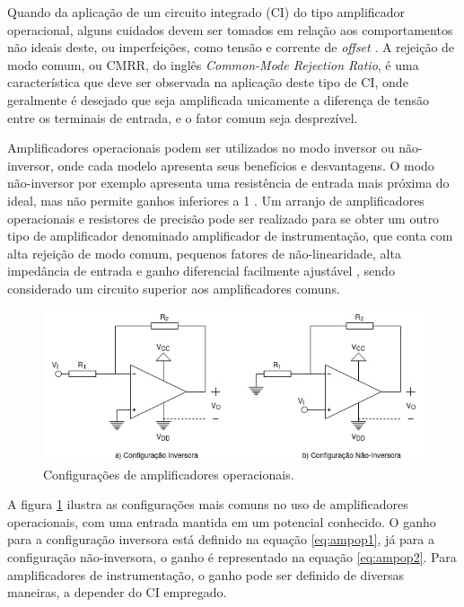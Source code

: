 Quando da aplicação de um circuito integrado (CI) do tipo amplificador
operacional, alguns cuidados devem ser tomados em relação aos
comportamentos não ideais deste, ou imperfeições, 
como tensão e corrente de \textit{offset} \cite{sedra1998microelectronic}.
A rejeição de modo comum, ou CMRR, do inglês \textit{Common-Mode Rejection Ratio},
é uma característica que deve ser observada na aplicação deste tipo de 
CI, onde geralmente é desejado que seja amplificada unicamente a 
diferença de tensão entre os terminais de entrada, e o fator comum
seja desprezível.

Amplificadores operacionais podem ser utilizados no modo inversor ou 
não-inversor, onde cada modelo apresenta seus benefícios e desvantagens.
O modo não-inversor por exemplo apresenta uma resistência de entrada mais
próxima do ideal, mas não permite ganhos inferiores a 1 \cite{sedra1998microelectronic}.
Um arranjo de amplificadores operacionais e resistores de precisão 
pode ser realizado para se obter um outro tipo de amplificador denominado
amplificador de instrumentação, que conta com alta rejeição de modo comum, 
pequenos fatores de não-linearidade, alta impedância de entrada e ganho
diferencial facilmente ajustável \cite{kitchin2006designer}, sendo 
considerado um circuito superior aos amplificadores comuns.

\begin{figure}[h]
    \caption{Configurações de amplificadores operacionais.}    
    
    \begin{centering}
        \includegraphics[width=1\columnwidth]{images/fundamentos/AmpOps.png}
    \par\end{centering}

    \label{fig:ampops}
\end{figure}

A figura \ref{fig:ampops} ilustra as configurações mais comuns no uso
de amplificadores operacionais, com uma entrada mantida em um potencial
conhecido. O ganho para a configuração inversora está definido na 
equação \ref{eq:ampop1}, já para a configuração não-inversora, o ganho é 
representado na equação \ref{eq:ampop2}. Para amplificadores de 
instrumentação, o ganho pode ser definido de diversas maneiras, a 
depender do CI empregado.

